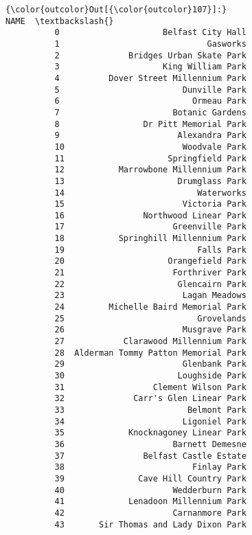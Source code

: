 \documentclass[11pt]{article}
\begin{document}
\begin{Verbatim}[commandchars=\\\{\}]
{\color{outcolor}Out[{\color{outcolor}107}]:}                                    NAME  \textbackslash{}
          0                     Belfast City Hall   
          1                              Gasworks   
          2              Bridges Urban Skate Park   
          3                     King William Park   
          4          Dover Street Millennium Park   
          5                         Dunville Park   
          6                           Ormeau Park   
          7                       Botanic Gardens   
          8                 Dr Pitt Memorial Park   
          9                        Alexandra Park   
          10                        Woodvale Park   
          11                     Springfield Park   
          12           Marrowbone Millennium Park   
          13                       Drumglass Park   
          14                           Waterworks   
          15                        Victoria Park   
          16                Northwood Linear Park   
          17                      Greenville Park   
          18           Springhill Millennium Park   
          19                           Falls Park   
          20                     Orangefield Park   
          21                      Forthriver Park   
          22                       Glencairn Park   
          23                        Lagan Meadows   
          24         Michelle Baird Memorial Park   
          25                           Grovelands   
          26                        Musgrave Park   
          27            Clarawood Millennium Park   
          28  Alderman Tommy Patton Memorial Park   
          29                        Glenbank Park   
          30                       Loughside Park   
          31                  Clement Wilson Park   
          32              Carr's Glen Linear Park   
          33                         Belmont Park   
          34                        Ligoniel Park   
          35             Knocknagoney Linear Park   
          36                      Barnett Demesne   
          37                Belfast Castle Estate   
          38                          Finlay Park   
          39               Cave Hill Country Park   
          40                      Wedderburn Park   
          41             Lenadoon Millennium Park   
          42                      Carnanmore Park   
          43       Sir Thomas and Lady Dixon Park   
          

\end{Verbatim}
\end{document}
